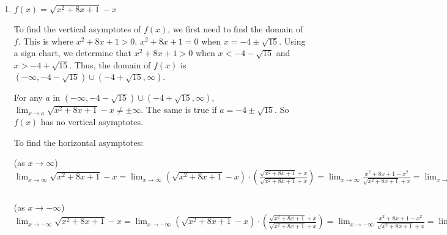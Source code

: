 \documentclass[nooutcomes]{ximera}
\begin{document}
\begin{problem}
\begin{enumerate}
\begin{freeResponse}
		In order for the graph of $f(x)$ to cross $y = \frac{\sqrt{2}}{3}$, we must have that 
		$\frac{\sqrt{2x^2 + 1}}{3x-5} = \frac{\sqrt{2}}{3}
		\qquad \Longrightarrow \qquad 3 \sqrt{2x^2+1} = \sqrt{2}(3x-5)
		\qquad \Longrightarrow \qquad 9 (2x^2 + 1) = 2(9x^2 - 30x + 25)
		\qquad \Longrightarrow \qquad 18x^2 + 9 = 18x^2 - 60x + 50
		\qquad \Longrightarrow \qquad 60x = 41
		\qquad \Longrightarrow \qquad x = \frac{41}{60}$.
		
		We need to check this:  $f \left( \frac{41}{60} \right) = -\frac{\sqrt{2}}{3}$.  So the graph of $f(x)$ never crosses the line $y= \frac{\sqrt{2}}{3}$, but it crosses $y= -\frac{\sqrt{2}}{3}$ at the point $\left( \frac{41}{60}, - \frac{\sqrt{2}}{3} \right)$.  
		\end{freeResponse}
	
	
	
	\item  $f(x) = \sqrt{x^2 + 8x + 1} - x$
	
		\begin{freeResponse}
		To find the vertical asymptotes of $f(x)$, we first need to find the domain of $f$.  This is where $x^2 + 8x + 1 > 0$.  $x^2 + 8x + 1 = 0$ when $x = -4 \pm \sqrt{15}$.   Using a sign chart, we determine that $x^2 + 8x + 1 > 0$ when $x < -4 - \sqrt{15}$ and $x > -4 + \sqrt{15}$.  Thus, the domain of $f(x)$ is $(-\infty, -4-\sqrt{15}) \cup (-4 + \sqrt{15}, \infty)$.  
		
		For any $a$ in $(-\infty, -4-\sqrt{15}) \cup (-4 + \sqrt{15}, \infty)$, $\lim_{x \to a} \sqrt{x^2 + 8x + 1} - x \neq \pm \infty$.  The same is true if $a = -4 \pm \sqrt{15}$.  So $f(x)$ has no vertical asymptotes.
		
		To find the horizontal asymptotes:
		
		(as $x \to \infty$)  $\lim_{x \to \infty} \sqrt{x^2 + 8x + 1} - x
		= \lim_{x \to \infty} \left( \sqrt{x^2 + 8x + 1} - x \right) \cdot \left( \frac{\sqrt{x^2 + 8x + 1} + x}{\sqrt{x^2 + 8x + 1} + x} \right) 
		=  \lim_{x \to \infty} \frac{x^2 + 8x + 1 - x^2}{\sqrt{x^2 + 8x + 1} + x} 
		= \lim_{x \to \infty} \frac{x \left( 8 + \frac{1}{x} \right)}{x \left( \sqrt{1 + \frac{8}{x} + \frac{1}{x^2}} + 1 \right)}
		= \lim_{x \to \infty} \frac{8 + \frac{1}{x}}{\sqrt{1 + \frac{8}{x} + \frac{1}{x^2}} + 1} 
		= \frac{8 + 0}{\sqrt{1 + 0 + 0} + 1}
		= \frac{8}{2} = 4.$
		
		(as $x \to -\infty$)  $\lim_{x \to -\infty} \sqrt{x^2 + 8x + 1} - x
		= \lim_{x \to -\infty} \left( \sqrt{x^2 + 8x + 1} - x \right) \cdot \left( \frac{\sqrt{x^2 + 8x + 1} + x}{\sqrt{x^2 + 8x + 1} + x} \right) 
		=  \lim_{x \to -\infty} \frac{x^2 + 8x + 1 - x^2}{\sqrt{x^2 + 8x + 1} + x} 
		= \lim_{x \to -\infty} \frac{x \left( 8 + \frac{1}{x} \right)}{-x \left( \sqrt{1 + \frac{8}{x} + \frac{1}{x^2}} + 1 \right)}
		= \lim_{x \to -\infty} - \frac{8 + \frac{1}{x}}{\sqrt{1 + \frac{8}{x} + \frac{1}{x^2}} + 1} 
		= -\frac{8 + 0}{\sqrt{1 + 0 + 0} + 1}
		= -\frac{8}{2} = -4.$
		

\end{freeResponse}
\end{enumerate}
\end{problem}
\end{document}
